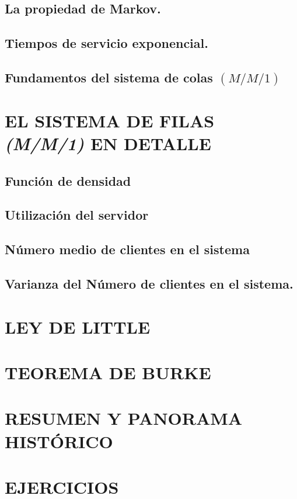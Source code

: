 \subsection{La propiedad de Markov.}


\subsection{Tiempos de servicio exponencial.}

\subsection{Fundamentos del sistema de colas $(M/M/1)$}

\section{EL SISTEMA DE FILAS \textit{(M/M/1)} EN DETALLE}
\subsection{Función de densidad}

\subsection{Utilización del servidor}

\subsection{Número medio de clientes en el sistema}

\subsection{Varianza del Número de clientes en el sistema.}

\section{LEY DE LITTLE}

\section{TEOREMA DE BURKE}

\section{RESUMEN Y PANORAMA HISTÓRICO}

\section{EJERCICIOS}




